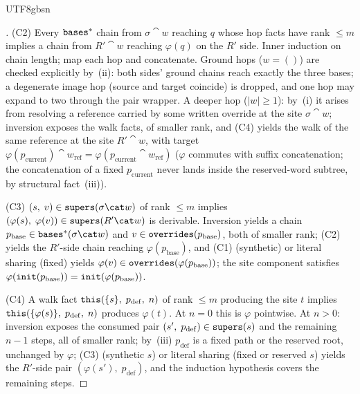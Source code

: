 \begin{CJK*}{UTF8}{gbsn}
\begin{proof}[]
  (C2) Every $\mathtt{bases}^*$ chain from $\sigma \cat w$ reaching $q$
  whose hop facts have rank $\le m$ implies a chain from
  $R' \cat w$ reaching $\varphi(q)$ on the $R'$ side. Inner
  induction on chain length; map each hop and concatenate. Ground
  hops ($w = ()$) are checked explicitly by~(ii): both sides' ground
  chains reach exactly the three bases; a degenerate image hop
  (source and target coincide) is dropped, and one hop may expand to
  two through the pair wrapper. A deeper hop ($|w| \ge 1$): by~(i)
  it arises from resolving a reference carried by some written
  override at the site $\sigma \cat w$; inversion exposes the walk
  facts, of smaller rank, and (C4) yields the walk of the same
  reference at the site $R' \cat w$, with target
  $\varphi(p_{\mathrm{current}}) \cat w_{\mathrm{ref}}
  = \varphi(p_{\mathrm{current}} \cat w_{\mathrm{ref}})$
  ($\varphi$ commutes with suffix concatenation; the concatenation
  of a fixed $p_{\mathrm{current}}$ never lands inside the
  reserved-word subtree, by structural fact~(iii)).

  (C3) $(s,\; v) \in \supers(\sigma \cat w)$ of rank $\le m$ implies
  $(\varphi(s),\; \varphi(v)) \in \supers(R' \cat w)$ is derivable.
  Inversion yields a chain $p_{\mathrm{base}} \in
  \bases^*(\sigma \cat w)$ and $v \in \mathtt{overrides}(p_{\mathrm{base}})$,
  both of smaller rank; (C2) yields the $R'$-side chain reaching
  $\varphi(p_{\mathrm{base}})$, and (C1) (synthetic) or literal
  sharing (fixed) yields
  $\varphi(v) \in \mathtt{overrides}(\varphi(p_{\mathrm{base}}))$; the site
  component satisfies $\varphi(\mathtt{init}(p_{\mathrm{base}})) =
  \mathtt{init}(\varphi(p_{\mathrm{base}}))$.

  (C4) A walk fact $\mathtt{this}(\{s\},\; p_{\mathrm{def}},\; n)$ of rank
  $\le m$ producing the site $t$ implies
  $\mathtt{this}(\{\varphi(s)\},\; p_{\mathrm{def}},\; n)$ produces
  $\varphi(t)$. At $n = 0$ this is $\varphi$ pointwise. At $n > 0$:
  inversion exposes the consumed pair
  $(s',\; p_{\mathrm{def}}) \in \mathtt{supers}(s)$ and the remaining
  $n - 1$ steps, all of smaller rank; by~(iii) $p_{\mathrm{def}}$ is
  a fixed path or the reserved root, unchanged by $\varphi$; (C3)
  (synthetic $s$) or literal sharing (fixed or reserved $s$) yields
  the $R'$-side pair $(\varphi(s'),\; p_{\mathrm{def}})$, and the
  induction hypothesis covers the remaining steps.


\end{proof}
\end{CJK*}

